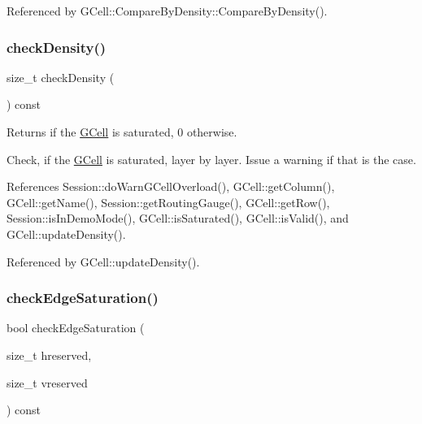 Referenced by G\+Cell\+::\+Compare\+By\+Density\+::\+Compare\+By\+Density().

\mbox{\label{classKatabatic_1_1GCell_a88208864ba2268689946a8cb7a86fcb2}} 
\subsubsection{\texorpdfstring{check\+Density()}{checkDensity()}}
{\footnotesize\ttfamily size\+\_\+t check\+Density (\begin{DoxyParamCaption}{ }\end{DoxyParamCaption}) const}

\begin{DoxyReturn}{Returns}
{} if the \hyperlink{classKatabatic_1_1GCell}{G\+Cell} is saturated, 0 otherwise.
\end{DoxyReturn}
Check, if the \hyperlink{classKatabatic_1_1GCell}{G\+Cell} is saturated, layer by layer. Issue a warning if that is the case. 

References Session\+::do\+Warn\+G\+Cell\+Overload(), G\+Cell\+::get\+Column(), G\+Cell\+::get\+Name(), Session\+::get\+Routing\+Gauge(), G\+Cell\+::get\+Row(), Session\+::is\+In\+Demo\+Mode(), G\+Cell\+::is\+Saturated(), G\+Cell\+::is\+Valid(), and G\+Cell\+::update\+Density().



Referenced by G\+Cell\+::update\+Density().

\mbox{\label{classKatabatic_1_1GCell_af4dcc99733b7ea77e8c3c7da9ac3cd3c}} 
\subsubsection{\texorpdfstring{check\+Edge\+Saturation()}{checkEdgeSaturation()}}
{\footnotesize\ttfamily bool check\+Edge\+Saturation (\begin{DoxyParamCaption}\item[{size\+\_\+t}]{hreserved,  }\item[{size\+\_\+t}]{vreserved }\end{DoxyParamCaption}) const}

